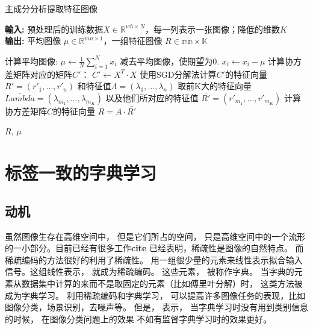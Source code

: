         \begin{algorithm}[t]
        \caption{主成分分析提取特征图像} %
        \hspace*{0.02in} {\bf 輸入:} %
        预处理后的训练数据$X \in \mathbb{R}^{wh \times N}$，每一列表示一张图像；降低的维数$K$ \\
        \hspace*{0.02in} {\bf 输出:} %
        平均图像 $\mu \in \mathbb{R}^{mn\times 1}$，一组特征图像 $R \in \mathbb {mn \times K}$
        \begin{algorithmic}[1]
        \State 计算平均图像: $\mu \leftarrow \frac{1}{N} \sum_{i=1}^N x_i$ %
        \State 减去平均图像，使期望为0. $x_i \leftarrow x_i - \mu$
        \State 计算协方差矩阵对应的矩阵$C'$： $C' \leftarrow X^T \cdot X$
        \State 使用SGD分解法计算$C'$的特征向量 $R' = (r'_1, \dots, r'_n)$ 和特征值$\Lambda = (\lambda_1, \dots, \lambda_n)$
        \State 取前K大的特征向量 $\bar{Lambda} = (\lambda_{m_1}, \dots, \lambda_{m_K})$ 以及他们所对应的特征值 $\bar {R'} = (r'_{m_1}, \dots, r'_{m_K})$
        \State 计算协方差矩阵$C$的特征向量 $R = A \cdot \bar{R'}$

        \State \Return $R$, $\mu$
        \end{algorithmic}
        \label{alg:eigenOCT}
        \end {algorithm}


\section{标签一致的字典学习}
\label{sec:lc-ksvd}
    \subsection{动机}
    虽然图像生存在高维空间中， 但是它们所占的空间， 只是高维空间中的一个流形的一小部分。目前已经有很多工作\textbf{cite} 已经表明，稀疏性是图像的自然特点。 而稀疏编码的方法很好的利用了稀疏性。 用一组很少量的元素来线性表示拟合输入信号。这组线性表示， 就成为稀疏编码。 这些元素， 被称作字典。 当字典的元素从数据集中计算的来而不是取固定的元素（比如傅里叶分解）时， 这类方法被成为字典学习。  利用稀疏编码和字典学习， 可以提高许多图像任务的表现，比如图像分类\cite{}，场景识别\cite{}，去噪声\cite{}等。  但是， \cite{}表示， 当字典学习时没有用到类别信息的时候，  在图像分类问题上的效果 不如有监督字典学习时的效果更好。 

